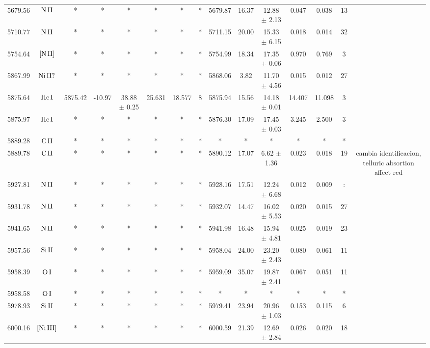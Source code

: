 \documentclass{article}
\begin{document}
\begin{table*}
\begin{adjustbox}{width=\textwidth}
\begin{tabular}{ccccccccccccccc}
5679.56 & $\mbox{N}\thinspace \mbox{II}$ & * & * & * & * & * & * & 5679.87 & 16.37 & 12.88 $\pm$ 2.13 & 0.047 & 0.038 & 13 &  \\
5710.77 & $\mbox{N}\thinspace \mbox{II}$ & * & * & * & * & * & * & 5711.15 & 20.00 & 15.33 $\pm$ 6.15 & 0.018 & 0.014 & 32 &  \\
5754.64 & $\mbox{[N}\thinspace \mbox{II]}$ & * & * & * & * & * & * & 5754.99 & 18.34 & 17.35 $\pm$ 0.06 & 0.970 & 0.769 & 3 &  \\
5867.99 & $\mbox{Ni}\thinspace \mbox{II?}$ & * & * & * & * & * & * & 5868.06 & 3.82 & 11.70 $\pm$ 4.56 & 0.015 & 0.012 & 27 &  \\
5875.64 & $\mbox{He}\thinspace \mbox{I}$ & 5875.42 & -10.97 & 38.88 $\pm$ 0.25 & 25.631 & 18.577 & 8 & 5875.94 & 15.56 & 14.18 $\pm$ 0.01 & 14.407 & 11.098 & 3 &  \\
5875.97 & $\mbox{He}\thinspace \mbox{I}$ & * & * & * & * & * & * & 5876.30 & 17.09 & 17.45 $\pm$ 0.03 & 3.245 & 2.500 & 3 &  \\
5889.28 & $\mbox{C}\thinspace \mbox{II}$ & * & * & * & * & * & * & * & * & * & * & * & * &  \\
5889.78 & $\mbox{C}\thinspace \mbox{II}$ & * & * & * & * & * & * & 5890.12 & 17.07 & 6.62 $\pm$ 1.36 & 0.023 & 0.018 & 19 &  cambia identificacion, telluric absortion affect red \\
5927.81 & $\mbox{N}\thinspace \mbox{II}$ & * & * & * & * & * & * & 5928.16 & 17.51 & 12.24 $\pm$ 6.68 & 0.012 & 0.009 & : &  \\
5931.78 & $\mbox{N}\thinspace \mbox{II}$ & * & * & * & * & * & * & 5932.07 & 14.47 & 16.02 $\pm$ 5.53 & 0.020 & 0.015 & 27 &  \\
5941.65 & $\mbox{N}\thinspace \mbox{II}$ & * & * & * & * & * & * & 5941.98 & 16.48 & 15.94 $\pm$ 4.81 & 0.025 & 0.019 & 23 &  \\
5957.56 & $\mbox{Si}\thinspace \mbox{II}$ & * & * & * & * & * & * & 5958.04 & 24.00 & 23.20 $\pm$ 2.43 & 0.080 & 0.061 & 11 &  \\
5958.39 & $\mbox{O}\thinspace \mbox{I}$ & * & * & * & * & * & * & 5959.09 & 35.07 & 19.87 $\pm$ 2.41 & 0.067 & 0.051 & 11 &  \\
5958.58 & $\mbox{O}\thinspace \mbox{I}$ & * & * & * & * & * & * & * & * & * & * & * & * &  \\
5978.93 & $\mbox{Si}\thinspace \mbox{II}$ & * & * & * & * & * & * & 5979.41 & 23.94 & 20.96 $\pm$ 1.03 & 0.153 & 0.115 & 6 &  \\
6000.16 & $\mbox{[Ni}\thinspace \mbox{III]}$ & * & * & * & * & * & * & 6000.59 & 21.39 & 12.69 $\pm$ 2.84 & 0.026 & 0.020 & 18 &  \\

\end{tabular}
\end{adjustbox}
\end{table*}
\end{document}
